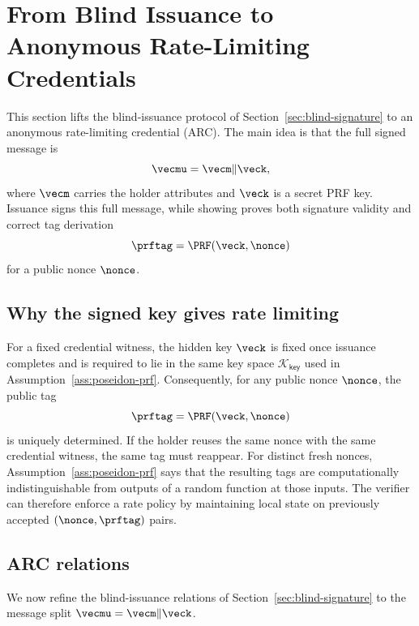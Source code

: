 \section{From Blind Issuance to Anonymous Rate-Limiting Credentials}
\label{sec:arc-construction}

This section lifts the blind-issuance protocol of Section~\ref{sec:blind-signature} to an anonymous
rate-limiting credential (ARC).  The main idea is that the full signed message is
\[
  \vecmu=\vecm\Vert\veck,
\]
where $\vecm$ carries the holder attributes and $\veck$ is a secret PRF key.  Issuance signs this full
message, while showing proves both signature validity and correct tag derivation
\[
  \prftag=\PRF(\veck,\nonce)
\]
for a public nonce $\nonce$.

\subsection{Why the signed key gives rate limiting}
For a fixed credential witness, the hidden key $\veck$ is fixed once issuance completes and is required to lie
in the same key space $\mathcal K_{\mathsf{key}}$ used in Assumption~\ref{ass:poseidon-prf}.  Consequently,
for any public nonce $\nonce$, the public tag
\[
  \prftag=\PRF(\veck,\nonce)
\]
is uniquely determined.  If the holder reuses the same nonce with the same credential witness, the same tag
must reappear.  For distinct fresh nonces, Assumption~\ref{ass:poseidon-prf} says that the resulting tags are
computationally indistinguishable from outputs of a random function at those inputs.  The verifier can therefore
enforce a rate policy by maintaining local state on previously accepted $(\nonce,\prftag)$ pairs.

\subsection{ARC relations}
We now refine the blind-issuance relations of Section~\ref{sec:blind-signature} to the message split
$\vecmu=\vecm\Vert\veck$.

